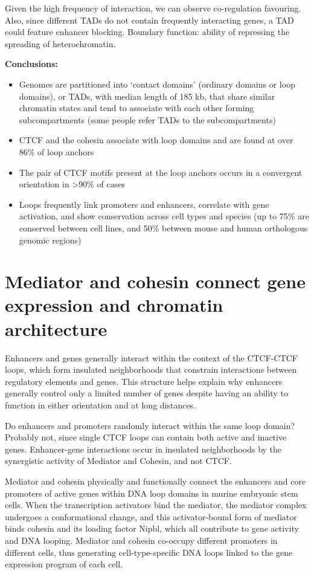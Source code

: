 Given the high frequency of interaction, we can observe co-regulation favouring. Also, since different TADs do not contain frequently interacting genes, a TAD could feature enhancer blocking. Boundary function: ability of repressing the spreading of heterochromatin. 

\textbf{Conclusions:}

\begin{itemize}
\tightlist
\item
  Genomes are partitioned into `contact domains' (ordinary domains or loop domains), or TADs, with median length of 185 kb, that share similar chromatin states and tend to associate with each other forming subcompartments (some people refer TADs to the subcompartments)
\item
  CTCF and the cohesin associate with loop domains and are found at over 86\% of loop anchors
\item
  The pair of CTCF motifs present at the loop anchors occurs in a convergent orientation in \textgreater90\% of cases
\item
  Loops frequently link promoters and enhancers, correlate with gene activation, and show conservation across cell types and species (up to 75\% are conserved between cell lines, and 50\% between mouse and human orthologous genomic regions)
\end{itemize}

\section{Mediator and cohesin connect gene expression and chromatin architecture}

Enhancers and genes generally interact within the context of the CTCF-CTCF loops, which form insulated neighborhoods that constrain interactions between regulatory elements and genes.
This structure helps explain why enhancers generally control only a limited number of genes despite having an ability to function in either orientation and at long distances.

Do enhancers and promoters randomly interact within the same loop domain? Probably not, since single CTCF loops can contain both active and inactive genes. Enhancer-gene interactions occur in insulated neighborhoods by the synergistic activity of Mediator and Cohesin, and not CTCF.

Mediator and cohesin physically and functionally connect the enhancers and core promoters of active genes within DNA loop domains in murine embryonic stem cells. When the transcription activators bind the mediator, the mediator complex undergoes a conformational change, and this activator-bound form of mediator binds cohesin and its loading factor Nipbl, which all contribute to gene activity and DNA looping. Mediator and cohesin co-occupy different promoters in different cells, thus generating cell-type-specific DNA loops linked to the gene expression program of each cell.

